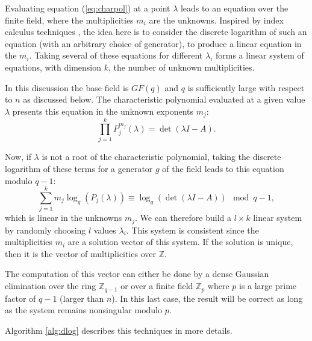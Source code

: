 \documentclass{article}
\newcommand{\Z}{\mathbb{Z}}
\begin{document}
Evaluating equation (\ref{eq:charpol}) at a point $\lambda$ leads to an
equation over the finite field, where the  multiplicities $m_i$ are
the unknowns.
Inspired by index calculus techniques
\cite{Coppersmith:1986:IndexCalculus},
 the idea here is to consider the discrete
logarithm of such an equation (with an arbitrary choice of generator), to
produce a linear equation in the $m_i$. Taking several of these
equations for different
$\lambda_i$ forms a linear system of equations, with dimension $k$,
the number of
unknown multiplicities.

In this discussion the base field is $GF(q)$ and $q$ is sufficiently
large with respect to $n$ as discussed below. 
The characteristic polynomial evaluated at a given value $\lambda$  presents this 
equation in the unknown exponents $m_j$:
\begin{equation}
\prod_{j=1}^k  P_j^{m_j}(\lambda) = \det(\lambda I - A).
\end{equation}

Now, if $\lambda$ is not a root of the characteristic polynomial, taking the
discrete logarithm of these terms for a generator $g$ of the field leads 
to this equation modulo $q-1$:
\begin{equation}\label{eq:log}
\sum_{j=1}^k  m_j\log_g(P_j(\lambda)) \equiv
\log_g(\det(\lambda I - A)) \mod  q-1,
\end{equation}
which is linear in the unknowns $m_j$.
We can therefore build a $l\times k$ linear system by randomly choosing $l$ values
$\lambda_i$. This system is consistent since the multiplicities $m_i$
are a solution vector of this system. If the solution is unique, then it is the
vector of multiplicities over $\Z$.

The computation of this vector can either be done by a dense Gaussian
elimination over the ring $\Z_{q-1}$ or over a finite field $\Z_p$ 
where $p$ is a large prime factor of $q-1$ (larger than $n$).
In this last case, the result will be correct as long as the system
remains nonsingular modulo $p$.






Algorithm \ref{alg:dlog} describes this techniques in more details.
\end{document}
